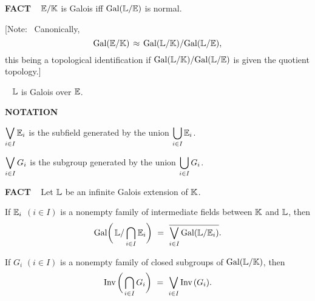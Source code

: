\vspace{0.1cm}


\begin{x}{\small\bf FACT} \ %
$\mathbb{E}/\mathbb{K}$ is Galois iff $\text{Gal}(\mathbb{L} / \mathbb{E})$ is normal.

\vspace{0.1cm}

[Note: \ Canonically, 
\[
\text{Gal}(\mathbb{E} / \mathbb{K}) \hspace{0.05cm} \approx \hspace{0.05cm} \text{Gal}(\mathbb{L} / \mathbb{K}) / \text{Gal}(\mathbb{L}  / \mathbb{E}),
\]
this being a topological identification if $\text{Gal}(\mathbb{L} / \mathbb{K})  / \text{Gal}(\mathbb{L} / \mathbb{E})$ is given the quotient topology.]
\end{x}

\vspace{0.1cm}

\begin{x}{\small\bf {}} \ %
$\mathbb{L}$ is Galois over $\mathbb{E}$.
\end{x}

\vspace{0.1cm}


\begin{x}{\small\bf NOTATION} \ %

\vspace{0.2cm}

\qquad \textbullet \quad
$\displaystyle\bigvee\limits_{i \in I} \mathbb{E}_i$ is the subfield generated by the union $\displaystyle\bigcup\limits_{i \in I} \mathbb{E}_i$.

\vspace{0.1cm}


\qquad \textbullet \quad
$\displaystyle\bigvee\limits_{i \in I} G_i$ is the subgroup generated by the union $\displaystyle\bigcup\limits_{i \in I} G_i$.

\vspace{0.1cm}

\end{x}

\vspace{0.1cm}


\begin{x}{\small\bf FACT} \ %
Let $\mathbb{L}$ be an infinite Galois extension of $\mathbb{K}$.

\vspace{0.2cm}

\qquad \textbullet \quad If $\mathbb{E}_i$ $(i \in I)$ is a nonempty family of intermediate fields between $\mathbb{K}$ and $\mathbb{L}$, then 
\[
\text{Gal} \biggl(\hspace{0.05cm} \mathbb{L} / \bigcap\limits_{i \in I} \mathbb{E}_i \biggr) \  = \  
\overline{\bigvee\limits_{i \in I} \text{Gal}(\mathbb{L} / \mathbb{E}_i)}.
\]

\vspace{0.1cm}

\qquad \textbullet \quad If $G_i$ $(i \in I)$ is a nonempty family of closed subgroups of $\text{Gal}(\mathbb{L} / \mathbb{K})$, then 
\[
\text{Inv}\hspace{0.05cm} \biggl(\hspace{0.05cm}\bigcap\limits_{i \in I} G_i \biggr) \  = \  
\bigvee\limits_{i \in I} \text{Inv}\hspace{0.05cm}(G_i).
\]

\vspace{0.1cm}


\end{x}

